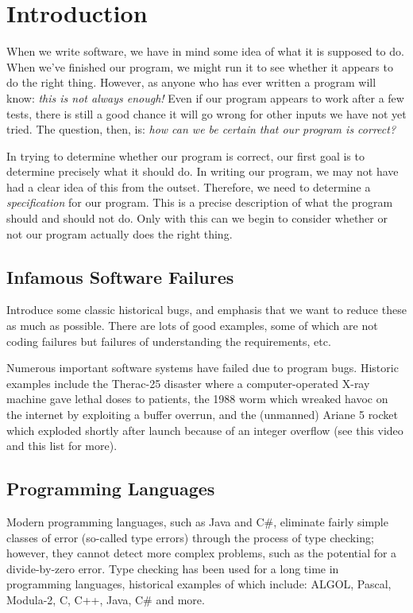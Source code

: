 \chapter{Introduction}
When we write software, we have in mind some idea of what it is supposed to do.  When we've finished our program, we might run it to see whether it appears to do the right thing.  However, as anyone who has ever written a program will know: {\em this is not always enough!}  Even if our program appears to work after a few tests, there is still a good chance it will go wrong for other inputs we have not yet tried.  The question, then, is: {\em how can we be certain that our program is correct?}

In trying to determine whether our program is correct, our first goal is to determine precisely what it should do.  In writing our program, we may not have had a clear idea of this from the outset.  Therefore, we need to determine a {\em specification} for our program.  This is a precise description of what the program should and should not do.  Only with this can we begin to consider whether or not our program actually does the right thing.


\section{Infamous Software Failures}

Introduce some classic historical bugs, and emphasis that we want to reduce these as much as possible.  There are lots of good examples, some of which are not coding failures but failures of understanding the requirements, etc.

Numerous important software systems have failed due to program bugs. Historic examples include the Therac-25 disaster where a computer-operated X-ray machine gave lethal doses to patients, the 1988 worm which wreaked havoc on the internet by exploiting a buffer overrun, and the (unmanned) Ariane 5 rocket which exploded shortly after launch because of an integer overflow (see this video and this list for more).

\section{Programming Languages}

Modern programming languages, such as Java and C\#, eliminate fairly simple classes of error (so-called type errors) through the process of type checking; however, they cannot detect more complex problems, such as the potential for a divide-by-zero error. Type checking has been used for a long time in programming languages, historical examples of which include: ALGOL, Pascal, Modula-2, C, C++, Java, C\# and more.

